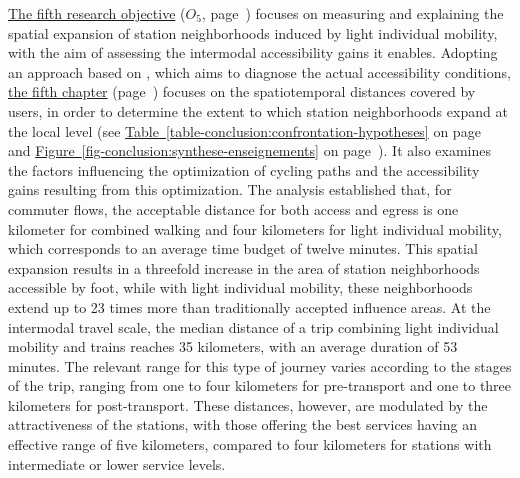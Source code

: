 \begin{refsegment}
\hyperref[objectif-5]{The fifth research objective} (\(O_5\), page~\pageref{objectif-5}) focuses on measuring and explaining the spatial expansion of station neighborhoods induced by light individual mobility, with the aim of assessing the intermodal accessibility gains it enables. Adopting an approach based on , which aims to diagnose the actual accessibility conditions, \hyperref[chap5:titre]{the fifth chapter} (page~\pageref{chap5:titre}) focuses on the spatiotemporal distances covered by users, in order to determine the extent to which station neighborhoods expand at the local level (see \hyperref[table-conclusion:confrontation-hypotheses]{Table~\ref{table-conclusion:confrontation-hypotheses}} on page~\pageref{table-conclusion:confrontation-hypotheses} and \hyperref[fig-conclusion:synthese-enseignements]{Figure~\ref{fig-conclusion:synthese-enseignements}} on page~\pageref{fig-conclusion:synthese-enseignements}). It also examines the factors influencing the optimization of cycling paths and the accessibility gains resulting from this optimization. The analysis established that, for commuter flows, the acceptable distance for both \gls{access} and \gls{egress} is one kilometer for combined walking and four kilometers for light individual mobility, which corresponds to an average time budget of twelve minutes. This spatial expansion results in a threefold increase in the area of station neighborhoods accessible by foot, while with light individual mobility, these neighborhoods extend up to 23 times more than traditionally accepted influence areas. At the intermodal travel scale, the median distance of a trip combining light individual mobility and trains reaches 35 kilometers, with an average duration of 53 minutes. The relevant range for this type of \gls{journey} varies according to the stages of the trip, ranging from one to four kilometers for pre-transport and one to three kilometers for post-transport. These distances, however, are modulated by the attractiveness of the stations, with those offering the best services having an effective range of five kilometers, compared to four kilometers for stations with intermediate or lower service levels.%


\end{refsegment}
